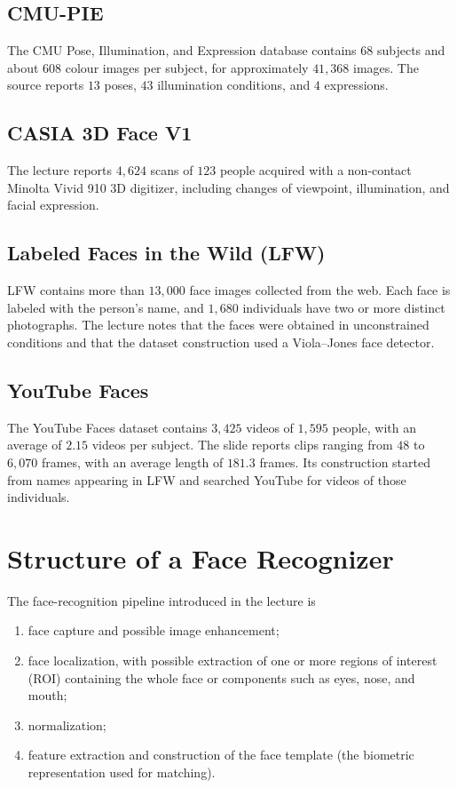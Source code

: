 \documentclass[11pt,a4paper,oneside]{report}
\begin{document}
\subsection{CMU-PIE}

The CMU Pose, Illumination, and Expression database contains $68$ subjects and
about $608$ colour images per subject, for approximately $41{,}368$ images.  The
source reports $13$ poses, $43$ illumination conditions, and $4$ expressions.

\subsection{CASIA 3D Face V1}

The lecture reports $4{,}624$ scans of $123$ people acquired with a non-contact
Minolta Vivid 910 3D digitizer, including changes of viewpoint, illumination,
and facial expression.

\subsection{Labeled Faces in the Wild (LFW)}

LFW contains more than $13{,}000$ face images collected from the web.  Each face
is labeled with the person's name, and $1{,}680$ individuals have two or more
distinct photographs.  The lecture notes that the faces were obtained in
unconstrained conditions and that the dataset construction used a Viola--Jones
face detector.

\subsection{YouTube Faces}

The YouTube Faces dataset contains $3{,}425$ videos of $1{,}595$ people, with an
average of $2.15$ videos per subject.  The slide reports clips ranging from $48$
to $6{,}070$ frames, with an average length of $181.3$ frames.  Its construction
started from names appearing in LFW and searched YouTube for videos of those
individuals.

\section{Structure of a Face Recognizer}
\label{sec:face-recognizer-structure}

The face-recognition pipeline introduced in the lecture is
\begin{enumerate}
    \item face capture and possible image enhancement;
    \item face localization, with possible extraction of one or more regions of
          interest (ROI) containing the whole face or components such as eyes,
          nose, and mouth;
    \item normalization;
    \item feature extraction and construction of the face template (the
          biometric representation used for matching).
\end{enumerate}
\end{document}
